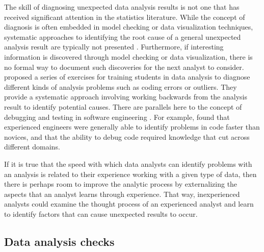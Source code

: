 \documentclass[
  12pt,
]{interact}
\begin{document}
The skill of diagnosing unexpected data analysis results is not one that
has received significant attention in the statistics literature. While
the concept of diagnosis is often embedded in model checking or data
visualization techniques, systematic approaches to identifying the root
cause of a general unexpected analysis result are typically not
presented \citep{peng2022perspective}. Furthermore, if interesting
information is discovered through model checking or data visualization,
there is no formal way to document such discoveries for the next analyst
to consider. \citet{peng_diagnosing_2021} proposed a series of exercises
for training students in data analysis to diagnose different kinds of
analysis problems such as coding errors or outliers. They provide a
systematic approach involving working backwards from the analysis result
to identify potential causes. There are parallels here to the concept of
debugging and testing in software engineering
\citep{donoghue2021teaching}. For example, \citet{li2019towards} found
that experienced engineers were generally able to identify problems in
code faster than novices, and that the ability to debug code required
knowledge that cut across different domains.

If it is true that the speed with which data analysts can identify
problems with an analysis is related to their experience working with a
given type of data, then there is perhaps room to improve the analytic
process by externalizing the aspects that an analyst learns through
experience. That way, inexperienced analysts could examine the thought
process of an experienced analyst and learn to identify factors that can
cause unexpected results to occur.

\subsection{Data analysis checks}\label{data-analysis-checks}
\end{document}
